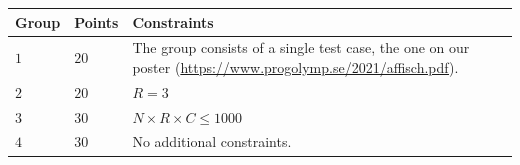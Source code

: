 \noindent
\begin{tabular}{| l | l | l |}
  \hline
  Group & Points & Constraints \\ \hline
  $1$    & $20$        &  The group consists of a single test case, the one on our poster (\url{https://www.progolymp.se/2021/affisch.pdf}). \\ \hline
  $2$    & $20$        &  $R=3$ \\ \hline
  $3$    & $30$        &  $N \times R \times C \le 1000$ \\ \hline
  $4$    & $30$       &  No additional constraints. \\ \hline
\end{tabular}

